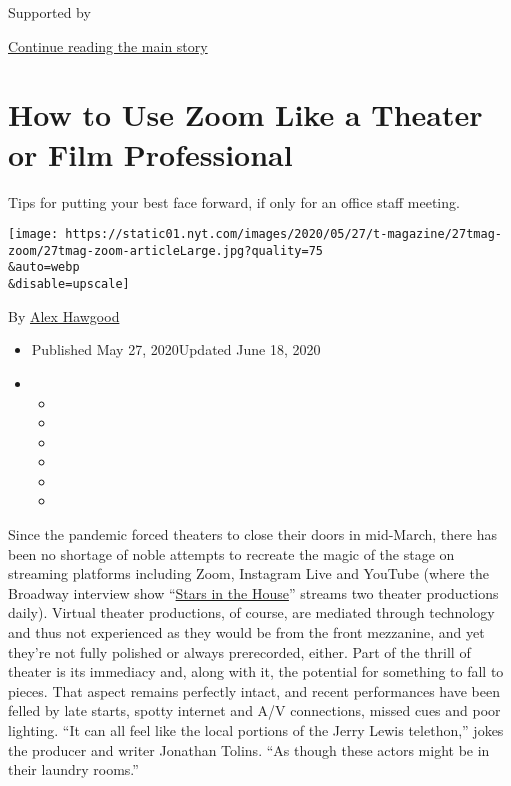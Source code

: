 Supported by

\protect\hyperlink{after-sponsor}{Continue reading the main story}

\hypertarget{how-to-use-zoom-like-a-theater-or-film-professional}{%
\section{How to Use Zoom Like a Theater or Film
Professional}\label{how-to-use-zoom-like-a-theater-or-film-professional}}

Tips for putting your best face forward, if only for an office staff
meeting.

\texttt{[image: https://static01.nyt.com/images/2020/05/27/t-magazine/27tmag-zoom/27tmag-zoom-articleLarge.jpg?quality=75\\\&auto=webp\\\&disable=upscale]}

By \href{https://www.nytimes.com/by/alex-hawgood}{Alex Hawgood}

\begin{itemize}
\item
  Published May 27, 2020Updated June 18, 2020
\item
  \begin{itemize}
  \item
  \item
  \item
  \item
  \item
  \item
  \end{itemize}
\end{itemize}

Since the pandemic forced theaters to close their doors in mid-March,
there has been no shortage of noble attempts to recreate the magic of
the stage on streaming platforms including Zoom, Instagram Live and
YouTube (where the Broadway interview show
``\href{https://www.starsinthehouse.com/}{Stars in the House}'' streams
two theater productions daily). Virtual theater productions, of course,
are mediated through technology and thus not experienced as they would
be from the front mezzanine, and yet they're not fully polished or
always prerecorded, either. Part of the thrill of theater is its
immediacy and, along with it, the potential for something to fall to
pieces. That aspect remains perfectly intact, and recent performances
have been felled by late starts, spotty internet and A/V connections,
missed cues and poor lighting. ``It can all feel like the local portions
of the Jerry Lewis telethon,'' jokes the producer and writer Jonathan
Tolins. ``As though these actors might be in their laundry rooms.''

